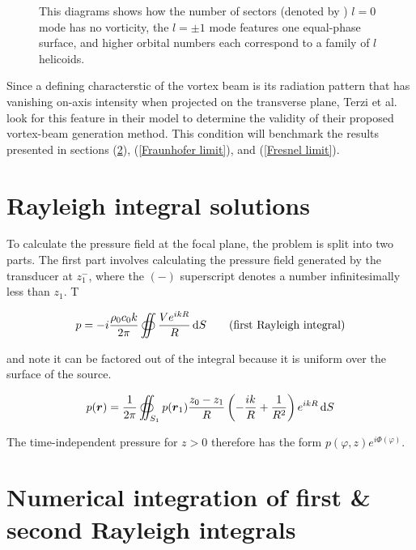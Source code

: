 \documentclass[12pt]{article}%
\begin{document}
\begin{figure}%
    \centering

    \caption{This diagrams shows how the number of sectors (denoted by ) $l=0$ mode has no vorticity, the $l= \pm1$ mode features one equal-phase surface, and higher orbital numbers each correspond to a family of $l$ helicoids.}
    \label{phase plate figure}
\end{figure}




Since a defining characterstic of the vortex beam is its radiation pattern that has vanishing on-axis intensity when projected on the transverse plane, Terzi et al. look for this feature in their model to determine the validity of their proposed vortex-beam generation method. This condition will benchmark the results presented in sections (\ref{Numerical integration}), (\ref{Fraunhofer limit}), and (\ref{Fresnel limit}).

\section{Rayleigh integral solutions}\label{Rayleigh integral solutions}

To calculate the pressure field at the focal plane, the problem is split into two parts. The first part involves calculating the pressure field generated by the \color{magenta}transducer\color{black} at $z_1^-$, where the $(-)$ superscript denotes a number infinitesimally less than $z_1$. T

\begin{equation}
p = -i \frac{\rho_0 c_0 k}{2\pi} \oiint \frac{V e^{ikR}}{R}\dif S \tag{first Rayleigh integral}
\end{equation}

and note it can be factored out of the integral because it is uniform over the surface of the source. 


\begin{equation}\label{Rayleigh 2}
p(\boldsymbol r) = \frac{1}{2\pi}\oiint_{S_1} p(\boldsymbol r_1) \frac{z_0- z_1}{R}\del{-\frac{ik}{R}+\frac{1}{R^2}} e^{ikR}\dif S
\end{equation}

The time-independent pressure for $z> 0$ therefore has the form $p(\varphi,z)e^{i\Phi(\varphi)}$. 


\section{Numerical integration of first \& second Rayleigh integrals}\label{Numerical integration}
\end{document}

